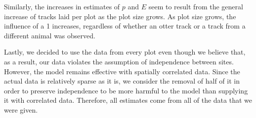 \documentclass[12pt]{article}
\begin{document}
    Similarly, the increases in estimates of \(p\) and \(E\) seem to result from
    the general increase of tracks laid per plot as the plot size grows. As plot
    size grows, the influence of a 1 increases, regardless of whether an otter
    track or a track from a different animal was observed.

    Lastly, we decided to use the data from every plot even though we believe
    that, as a result, our data violates the assumption of independence between
    sites. However, the model remains effective with spatially correlated data.
    Since the actual data is relatively sparse as it is, we consider the removal
    of half of it in order to preserve independence to be more harmful to the
    model than supplying it with correlated data. Therefore, all estimates come
    from all of the data that we were given.
\end{document}

